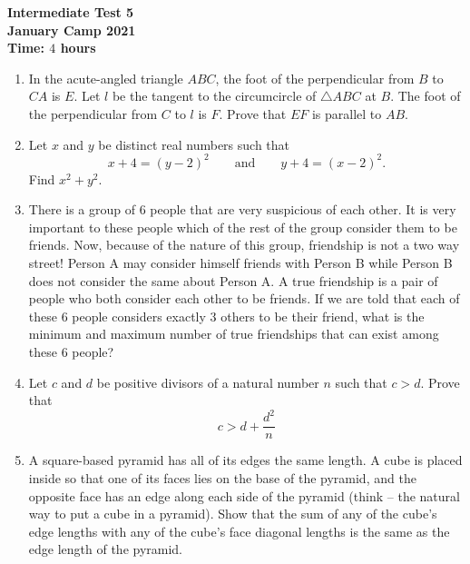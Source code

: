 \documentclass{article}
\begin{document}
\thispagestyle{empty}

\begin{center}
  \textbf{\Large Intermediate Test 5}
  \\ \vspace{1em}
  \textbf{\large January Camp 2021}
  \\ \vspace{1em}
  \textbf{\large Time: $4$ hours}
\end{center}

\vspace{12pt}

\begin{enumerate}[1.]

\item %
In the acute-angled triangle $ABC$, the foot of the perpendicular from $B$ to $CA$ is $E$. Let $l$ be the tangent to the circumcircle of $\triangle ABC$ at $B$. The foot of the perpendicular from $C$ to $l$ is $F$. Prove that $EF$ is parallel to $AB$.


\item %
Let $x$ and $y$ be distinct real numbers such that $$x + 4 = (y - 2)^2 \qquad\text{and}\qquad y + 4 = (x - 2)^2.$$
Find $x^2 + y^2$.


\item %
There is a group of 6 people that are very suspicious of each other. It is very important to these people which of the rest of the group consider them to be friends. Now, because of the nature of this group, friendship is not a two way street! Person A may consider himself friends with Person B while Person B does not consider the same about Person A. A true friendship is a pair of people who both consider each other to be friends. If we are told that each of these 6 people considers exactly 3 others to be their friend, what is the minimum and maximum number of true friendships that can exist among these 6 people?


\item %
Let $c$ and $d$ be positive divisors of a natural number $n$ such that $c > d$. Prove that $$c > d + \frac{d^2}{n}$$


\item %
A square-based pyramid has all of its edges the same length.
A cube is placed inside so that one of its faces lies on the base of the pyramid, and the opposite face has an edge along each side of the pyramid (think -- the natural way to put a cube in a pyramid).
Show that the sum of any of the cube's edge lengths with any of the cube's face diagonal lengths is the same as the edge length of the pyramid.



\end{enumerate}
\end{document}
